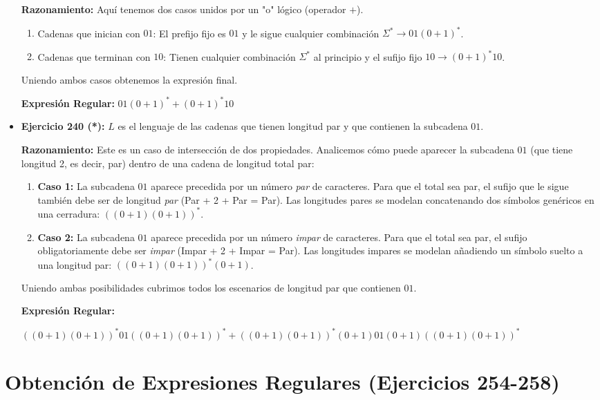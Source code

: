 \documentclass[12pt]{article}
\begin{document}
\begin{itemize}
    \textbf{Razonamiento:} Aquí tenemos dos casos unidos por un "o" lógico (operador $+$). 
    \begin{enumerate}
        \item Cadenas que inician con $01$: El prefijo fijo es $01$ y le sigue cualquier combinación $\Sigma^* \rightarrow 01(0+1)^*$.
        \item Cadenas que terminan con $10$: Tienen cualquier combinación $\Sigma^*$ al principio y el sufijo fijo $10 \rightarrow (0+1)^*10$.
    \end{enumerate}
    Uniendo ambos casos obtenemos la expresión final.
    
    \textbf{Expresión Regular:} $01(0+1)^* + (0+1)^*10$

    \vspace{0.4cm}
    
    \item \textbf{Ejercicio 240 (*):} $L$ es el lenguaje de las cadenas que tienen longitud par y que contienen la subcadena $01$.
    
    \textbf{Razonamiento:} Este es un caso de intersección de dos propiedades. Analicemos cómo puede aparecer la subcadena $01$ (que tiene longitud 2, es decir, par) dentro de una cadena de longitud total par:
    \begin{enumerate}
        \item \textbf{Caso 1:} La subcadena $01$ aparece precedida por un número \textit{par} de caracteres. Para que el total sea par, el sufijo que le sigue también debe ser de longitud \textit{par} (Par + 2 + Par = Par). Las longitudes pares se modelan concatenando dos símbolos genéricos en una cerradura: $((0+1)(0+1))^*$.
        \item \textbf{Caso 2:} La subcadena $01$ aparece precedida por un número \textit{impar} de caracteres. Para que el total sea par, el sufijo obligatoriamente debe ser \textit{impar} (Impar + 2 + Impar = Par). Las longitudes impares se modelan añadiendo un símbolo suelto a una longitud par: $((0+1)(0+1))^*(0+1)$.
    \end{enumerate}
    Uniendo ambas posibilidades cubrimos todos los escenarios de longitud par que contienen $01$.
    
    \textbf{Expresión Regular:} 
    
    $((0+1)(0+1))^* 01 ((0+1)(0+1))^* + ((0+1)(0+1))^*(0+1) 01 (0+1)((0+1)(0+1))^*$

\end{itemize}
\section*{Obtención de Expresiones Regulares (Ejercicios 254-258)}
\end{document}
